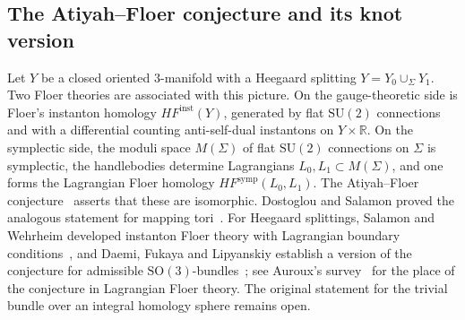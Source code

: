 \documentclass[11pt,reqno]{amsart}
\theoremstyle{plain}
\theoremstyle{definition}
\newcommand{\R}{\mathbb{R}}
\newcommand{\SU}{\mathrm{SU}(2)}
\newcommand{\SO}{\mathrm{SO}(3)}
\begin{document}
\subsection{The Atiyah--Floer conjecture and its knot version}\label{sec:intro-af}
Let $Y$ be a closed oriented $3$-manifold with a Heegaard splitting $Y=Y_0\cup_\Sigma Y_1$. Two Floer
theories are associated with this picture. On the gauge-theoretic side is Floer's instanton homology
$HF^{\mathrm{inst}}(Y)$, generated by flat $\SU$ connections and with a differential counting
anti-self-dual instantons on $Y\times\R$. On the symplectic side, the moduli space $M(\Sigma)$ of flat
$\SU$ connections on $\Sigma$ is symplectic, the handlebodies determine Lagrangians $L_0,L_1\subset
M(\Sigma)$, and one forms the Lagrangian Floer homology $HF^{\mathrm{symp}}(L_0,L_1)$. The Atiyah--Floer
conjecture~\cite{Atiyah} asserts that these are isomorphic. Dostoglou and Salamon proved the analogous
statement for mapping tori~\cite{DS}. For Heegaard splittings, Salamon and Wehrheim developed instanton
Floer theory with Lagrangian boundary conditions~\cite{SW}, and Daemi, Fukaya and Lipyanskiy establish a
version of the conjecture for admissible $\SO$-bundles~\cite{DFL}; see Auroux's survey~\cite{Auroux} for
the place of the conjecture in Lagrangian Floer theory. The original statement for the trivial bundle
over an integral homology sphere remains open.
\end{document}
